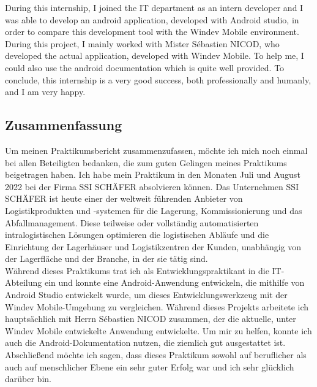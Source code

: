 \documentclass[a4paper, 12pt, french]{article}
\begin{document}
	During this internship, I joined the IT department as an intern developer and I was able to develop an android application, developed with Android studio, in order to compare this development tool with the Windev Mobile environment. During this project, I mainly worked with Mister Sébastien NICOD, who developed the actual application, developed with Windev Mobile. To help me, I could also use the android documentation which is quite well provided. To conclude, this internship is a very good success, both professionally and humanly, and I am very happy.

		\subsection*{Zusammenfassung}
	Um meinen Praktikumsbericht zusammenzufassen, möchte ich mich noch einmal bei allen Beteiligten bedanken, die zum guten Gelingen meines Praktikums beigetragen haben. Ich habe mein Praktikum in den Monaten Juli und August 2022 bei der Firma SSI SCHÄFER absolvieren können. Das Unternehmen SSI SCHÄFER ist heute einer der weltweit führenden Anbieter von Logistikprodukten und -systemen für die Lagerung, Kommissionierung und das Abfallmanagement. Diese teilweise oder vollständig automatisierten intralogistischen Lösungen optimieren die logistischen Abläufe und die Einrichtung der Lagerhäuser und Logistikzentren der Kunden, unabhängig von der Lagerfläche und der Branche, in der sie tätig sind.\\
	
	Während dieses Praktikums trat ich als Entwicklungspraktikant in die IT-Abteilung ein und konnte eine Android-Anwendung entwickeln, die mithilfe von Android Studio entwickelt wurde, um dieses Entwicklungswerkzeug mit der Windev Mobile-Umgebung zu vergleichen. Während dieses Projekts arbeitete ich hauptsächlich mit Herrn Sébastien NICOD zusammen, der die aktuelle, unter Windev Mobile entwickelte Anwendung entwickelte. Um mir zu helfen, konnte ich auch die Android-Dokumentation nutzen, die ziemlich gut ausgestattet ist. Abschließend möchte ich sagen, dass dieses Praktikum sowohl auf beruflicher als auch auf menschlicher Ebene ein sehr guter Erfolg war und ich sehr glücklich darüber bin.
\end{document}
